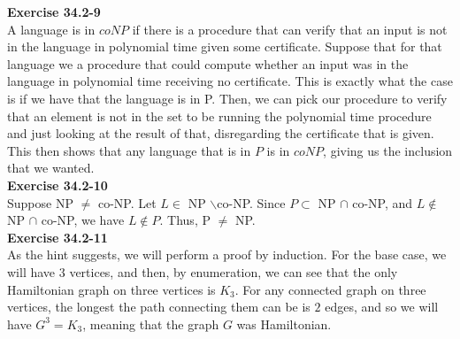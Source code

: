 \documentclass{article}
\begin{document}
\noindent\textbf{Exercise 34.2-9}\\

A language is in $coNP$ if there is a procedure that can verify that an input is not in the language in polynomial time given some certificate. Suppose that for that language we a procedure that could compute whether an input was in the language in polynomial time receiving no certificate. This is exactly what the case is if we have that the language is in P. Then, we can pick our procedure to verify that an element is not in the set to be running the polynomial time procedure and just looking at the result of that, disregarding the certificate that is given. This then shows that any language that is in $P$ is in $coNP$, giving us the inclusion that we wanted.\\

\noindent\textbf{Exercise 34.2-10}\\

Suppose NP $\neq$ co-NP.  Let $L \in$ NP $\backslash$co-NP.  Since $P \subset $ NP $\cap$ co-NP, and $L \notin $ NP $ \cap $ co-NP, we have $L \notin P$.  Thus, P $\neq$ NP.\\

\noindent\textbf{Exercise 34.2-11}\\

As the hint suggests, we will perform a proof by induction. For the base case, we will have $3$ vertices, and then, by enumeration, we can see that the only Hamiltonian graph on three vertices is $K_3$. For any connected graph on three vertices, the longest the path connecting them can be is $2$ edges, and so we will have $G^3 = K_3$, meaning that the graph $G$ was Hamiltonian.
\end{document}
